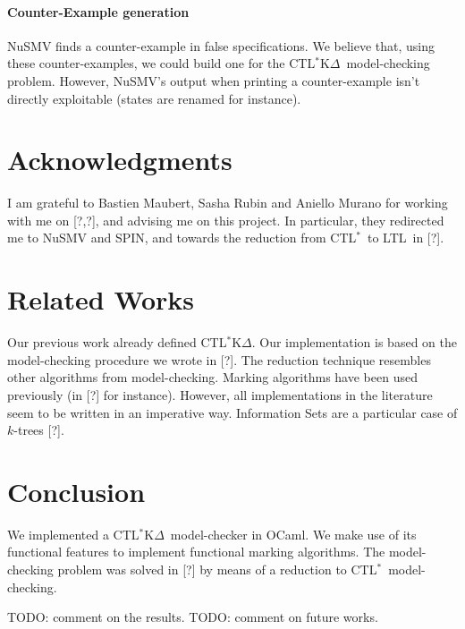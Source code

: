 \documentclass[dvipsnames]{acmart}
\def\ctls{CTL$^{*}$}
\def\ctlskd{CTL$^{*}$K$\Delta$}
\def\ltl{LTL}
\begin{document}
\paragraph{Counter-Example generation}
NuSMV finds a counter-example in false specifications. We believe that, using these counter-examples, we could build one for the \ctlskd\ model-checking problem. However, NuSMV's output when printing a counter-example isn't directly exploitable (states are renamed for instance).

\section{Acknowledgments}
I am grateful to Bastien Maubert, Sasha Rubin and Aniello Murano for working with me on [?,?], and advising me on this project.
In particular, they redirected me to NuSMV and SPIN, and towards the reduction from \ctls\ to \ltl\ in [?].

\section{Related Works}
Our previous work already defined \ctlskd. Our implementation is based on the model-checking procedure we wrote in [?].
The reduction technique resembles other algorithms from model-checking.
Marking algorithms have been used previously (in [?] for instance).
However, all implementations in the literature seem to be written in an imperative way.
Information Sets are a particular case of $k$-trees [?].


\section{Conclusion}
We implemented a \ctlskd\ model-checker in OCaml. We make use of its functional features to implement functional marking algorithms. The model-checking problem was solved in [?] by means of a reduction to \ctls\ model-checking.

TODO: comment on the results.
TODO: comment on future works.
\end{document}
